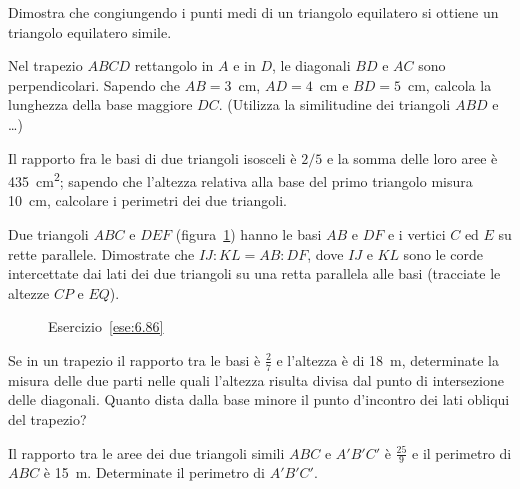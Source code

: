 \begin{multicols}{2}
\begin{esercizio}
\label{ese:6.83}
Dimostra che congiungendo i punti medi di un triangolo equilatero si ottiene un triangolo equilatero simile.
\end{esercizio}

\begin{esercizio}
\label{ese:6.84}
Nel trapezio $ABCD$ rettangolo in $A$ e in $D$, le diagonali $BD$ e $AC$ sono perpendicolari. Sapendo che $AB=3$~cm, $AD=4$~cm e $BD=5$~cm, calcola la lunghezza della base maggiore $DC$. (Utilizza la similitudine dei triangoli $ABD$ e \ldots{})
\end{esercizio}

\begin{esercizio}
\label{ese:6.85}
Il rapporto fra le basi di due triangoli isosceli è $2/5$ e la somma delle loro aree è 435~cm\textsuperscript{2}; sapendo che l'altezza relativa alla base del primo triangolo misura 10~cm, calcolare i perimetri dei due triangoli. 
\end{esercizio}

\begin{esercizio}
\label{ese:6.86}
Due triangoli $ABC$ e $DEF$ (figura~\ref{fig:ese6.86}) hanno le basi $AB$ e $DF$ e i vertici $C$ ed $E$ su rette parallele. Dimostrate che $IJ:KL=AB:DF$, dove $IJ$ e $KL$ sono le corde intercettate dai lati dei due triangoli su una retta parallela alle basi (tracciate le altezze $CP$ e $EQ$).
\end{esercizio}

\begin{figure}[!htb]
	\centering
	\caption{Esercizio~\ref{ese:6.86}}\label{fig:ese6.86}
\end{figure}

\begin{esercizio}
\label{ese:6.87}
Se in un trapezio il rapporto tra le basi è $\frac{2}{7}$ e l'altezza è di 18~m, determinate la misura delle due parti nelle quali l'altezza risulta divisa dal punto di intersezione delle diagonali. Quanto dista dalla base minore il punto d'incontro dei lati obliqui del trapezio?
\end{esercizio}

\begin{esercizio}
\label{ese:6.88}
Il rapporto tra le aree dei due triangoli simili $ABC$ e $A'B'C'$ è $\frac{25}{9}$ e il perimetro di $ABC$ è 15~m. Determinate il perimetro di $A'B'C'$.
\end{esercizio}


\end{multicols}

